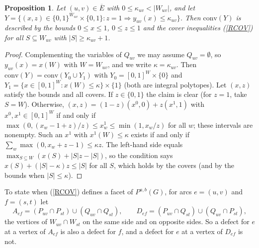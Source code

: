 \documentclass[a4paper,11pt]{article}
\newcommand{\Eb}{\overline{E}}
\newtheorem{prop}{Proposition}
\theoremstyle{definition}
\begin{document}
\begin{prop} \label{PHULL}
Let $(u,v) \in \Eb$ with $0 \leq \kappa_{uv} < |W_{uv}|$, and let $Y = \{ (x,z) \in \{0,1\}^{W_{uv}} \times \{0,1\} : z = 1 \Rightarrow y_{uv}(x) \leq \kappa_{uv} \}$.
Then $\mathrm{conv}(Y)$ is described by the bounds $0 \leq x \leq 1$, $0 \leq z \leq 1$ and the cover inequalities (\ref{RCOV}) for all
$S \subseteq W_{uv}$ with $|S| \geq \kappa_{uv}+1$.
\end{prop}
\begin{proof}
Complementing the variables of $Q_{uv}$ we may assume $Q_{uv} = \emptyset$, so $y_{uv}(x) = x(W)$ with $W = W_{uv}$, and we write $\kappa = \kappa_{uv}$.
Then $\mathrm{conv}(Y) = \mathrm{conv}(Y_0 \cup Y_1)$ with $Y_0 = [0,1]^W \times \{0\}$ and $Y_1 = \{ x \in [0,1]^W : x(W) \leq \kappa \} \times \{1\}$
(both are integral polytopes). Let $(x,z)$ satisfy the bounds and all covers. If $z \in \{0,1\}$ the claim is clear (for $z = 1$, take
$S = W$). Otherwise, $(x,z) = (1-z)(x^0, 0) + z(x^1, 1)$ with $x^0, x^1 \in [0,1]^W$ if and only if
$\max(0, (x_w - 1 + z)/z) \leq x^1_w \leq \min(1, x_w/z)$ for all $w$; these intervals are nonempty. Such an $x^1$ with $x^1(W) \leq \kappa$
exists if and only if $\sum_w \max(0, x_w + z - 1) \leq \kappa z$. The left-hand side equals $\max_{S \subseteq W} (x(S) + |S|z - |S|)$, so the
condition says $x(S) + (|S| - \kappa) z \leq |S|$ for all $S$, which holds by the covers (and by the bounds when $|S| \leq \kappa$).
\end{proof}

To state when (\ref{RCOV}) defines a facet of $P^{a,b}(G)$, for arcs $e = (u,v)$ and $f = (s,t)$ let
$$A_{ef} = (P_{uv} \cap P_{st}) \cup (Q_{uv} \cap Q_{st}), \qquad D_{ef} = (P_{uv} \cap Q_{st}) \cup (Q_{uv} \cap P_{st}),$$
the vertices of $W_{uv} \cap W_{st}$ on the same side and on opposite sides. So a defect for $e$ at a vertex of $A_{ef}$ is also a defect for $f$,
and a defect for $e$ at a vertex of $D_{ef}$ is not.
\end{document}
